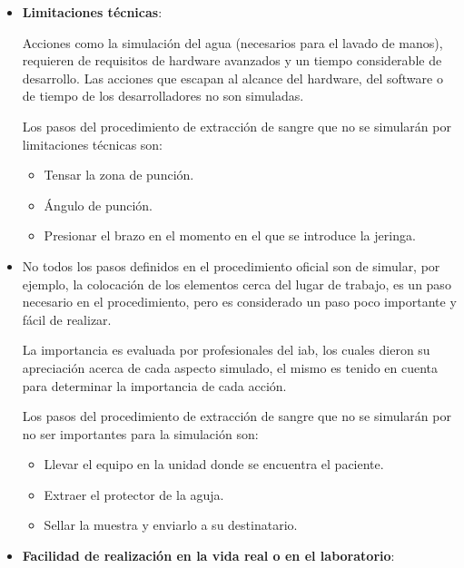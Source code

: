 \begin{itemize}
\item  \textbf{Limitaciones técnicas}: 
    
    Acciones como la simulación del agua (necesarios para el lavado de manos),
    requieren de requisitos de hardware avanzados y un tiempo considerable de
    desarrollo. Las acciones que escapan al alcance del hardware, del software o
    de tiempo de los desarrolladores no son simuladas. 
        
    Los pasos del procedimiento de extracción de sangre que no se simularán por 
    limitaciones técnicas son:
    \begin{itemize}
        \item Tensar la zona de punción.
        \item Ángulo de punción.
        \item Presionar el brazo en el momento en el que se introduce la jeringa.
    \end{itemize}
    
    
\item  {} 

    No todos los pasos definidos en el procedimiento        
    oficial son  de simular, por ejemplo, la
    colocación de los elementos cerca del lugar de trabajo, es un paso necesario
    en el procedimiento, pero es considerado un paso poco importante y fácil de
    realizar.

    La importancia es evaluada por profesionales del \Gls{iab}, los
    cuales dieron su apreciación acerca de cada aspecto simulado, el mismo
    es tenido en cuenta para determinar la importancia de cada
    acción.
    
    Los pasos del procedimiento de extracción de sangre que no se simularán por 
    no ser importantes para la simulación son:
    \begin{itemize}
        \item Llevar el equipo en la unidad donde se encuentra el paciente.
        \item Extraer el protector de la aguja.
        \item Sellar la muestra y enviarlo a su destinatario.
    \end{itemize}
    
    
\item \textbf{Facilidad de realización en la vida real o en el laboratorio}:


\end{itemize}
